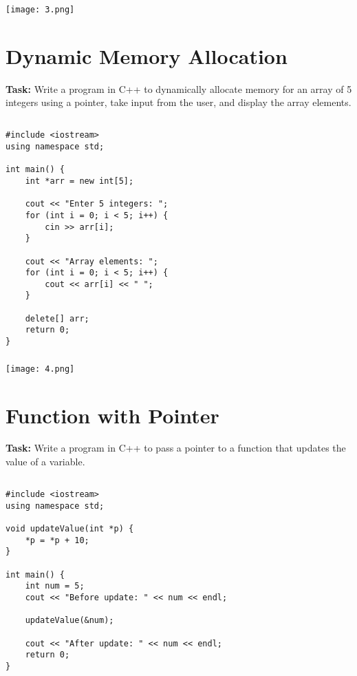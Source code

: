 \documentclass[12pt,a4paper]{article}
\begin{document}
\subsubsection{}
\begin{center}
    \texttt{[image: 3.png]}
\end{center}


\section{Dynamic Memory Allocation}
\textbf{Task:} Write a program in C++ to dynamically allocate memory for an array of 5 integers using a pointer, take input from the user, and display the array elements. 

\subsection{}
\begin{lstlisting}
#include <iostream>
using namespace std;

int main() {
    int *arr = new int[5];

    cout << "Enter 5 integers: ";
    for (int i = 0; i < 5; i++) {
        cin >> arr[i];
    }

    cout << "Array elements: ";
    for (int i = 0; i < 5; i++) {
        cout << arr[i] << " ";
    }

    delete[] arr;
    return 0;
}

\end{lstlisting}

\subsubsection{}
\begin{center}
    \texttt{[image: 4.png]}
\end{center}


\section{Function with Pointer }
\textbf{Task:} Write a program in C++ to pass a pointer to a function that updates the value of a variable. 

\subsection{}
\begin{lstlisting}
#include <iostream>
using namespace std;

void updateValue(int *p) {
    *p = *p + 10;
}

int main() {
    int num = 5;
    cout << "Before update: " << num << endl;

    updateValue(&num);

    cout << "After update: " << num << endl;
    return 0;
}

\end{lstlisting}
\end{document}
